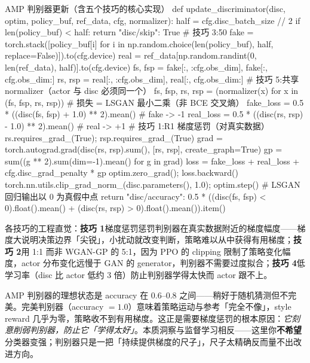 \begin{codebox}[Python]{AMP 判别器更新（含五个技巧的核心实现）}
def update_discriminator(disc, optim, policy_buf, ref_data, cfg, normalizer):
    half = cfg.disc_batch_size // 2
    if len(policy_buf) < half:
        return {"disc/skip": True}
    # 技巧 3:50%
    fake = torch.stack([policy_buf[i] for i in
        np.random.choice(len(policy_buf), half, replace=False)]).to(cfg.device)
    real = ref_data[np.random.randint(0, len(ref_data), half)].to(cfg.device)
    fs, fsp = fake[:, :cfg.obs_dim], fake[:, cfg.obs_dim:]
    rs, rsp = real[:, :cfg.obs_dim], real[:, cfg.obs_dim:]
    # 技巧 5:共享 normalizer（actor 与 disc 必须同一个）
    fs, fsp, rs, rsp = (normalizer(x) for x in (fs, fsp, rs, rsp))
    # 损失 = LSGAN 最小二乘（非 BCE 交叉熵）
    fake_loss = 0.5 * ((disc(fs, fsp) + 1.0) ** 2).mean()   # fake -> -1
    real_loss = 0.5 * ((disc(rs, rsp) - 1.0) ** 2).mean()   # real -> +1
    # 技巧 1:R1 梯度惩罚（对真实数据）
    rs.requires_grad_(True); rsp.requires_grad_(True)
    grad = torch.autograd.grad(disc(rs, rsp).sum(), [rs, rsp],
                               create_graph=True)
    gp = sum((g ** 2).sum(dim=-1).mean() for g in grad)
    loss = fake_loss + real_loss + cfg.disc_grad_penalty * gp
    optim.zero_grad(); loss.backward()
    torch.nn.utils.clip_grad_norm_(disc.parameters(), 1.0); optim.step()
    # LSGAN 回归输出以 0 为真假中点
    return {"disc/accuracy":
            0.5 * ((disc(fs, fsp) < 0).float().mean()
                   + (disc(rs, rsp) > 0).float().mean()).item()}
\end{codebox}

各技巧的工程直觉：\textbf{技巧 1}梯度惩罚惩罚判别器在真实数据附近的梯度幅度——梯度大说明决策边界「尖锐」，小扰动就改变判断，策略难以从中获得有用梯度；\textbf{技巧 2}用 1:1 而非 WGAN-GP 的 5:1，因为 PPO 的 clipping 限制了策略变化幅度，actor 分布变化远慢于 GAN 的 generator，判别器不需要过度拟合；\textbf{技巧 4}低学习率（disc 比 actor 低约 3 倍）防止判别器学得太快而 actor 跟不上。

\begin{insight}\label{ins:rlmc-imit-discsweet}
AMP 判别器的理想状态是 accuracy 在 0.6--0.8 之间——稍好于随机猜测但不完美。完美判别器（accuracy $=1.0$）意味着策略运动与参考「完全不像」，style reward 几乎为零，策略收不到有用梯度。这正是需要梯度惩罚的根本原因：\emph{它刻意削弱判别器，防止它「学得太好」}。本质洞察与监督学习相反——这里你\textbf{不希望}分类器变强；判别器只是一把「持续提供梯度的尺子」，尺子太精确反而量不出改进方向。
\end{insight}

